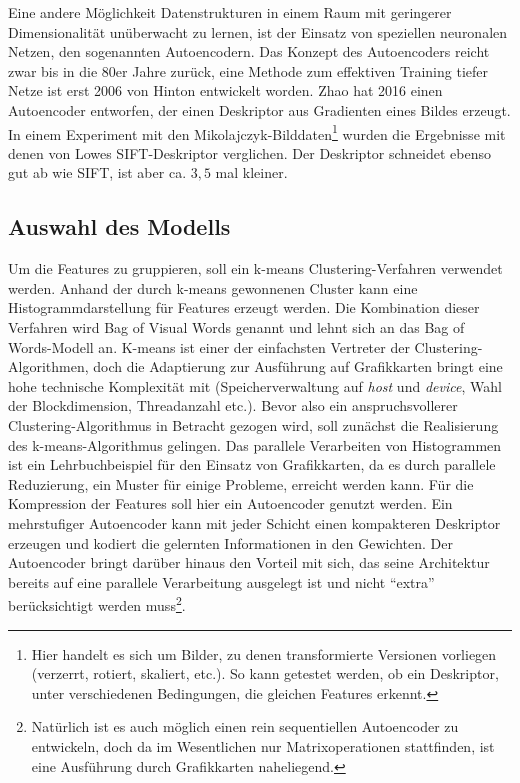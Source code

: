 
Eine andere Möglichkeit Datenstrukturen in einem Raum mit geringerer Dimensionalität unüberwacht zu lernen, ist der Einsatz von speziellen neuronalen Netzen, den sogenannten Autoencodern. Das Konzept des Autoencoders reicht zwar bis in die 80er Jahre zurück, eine Methode zum effektiven Training tiefer Netze ist erst 2006 von Hinton \cite{dae2006} entwickelt worden. Zhao \cite{aed2016} hat 2016 einen Autoencoder entworfen, der einen Deskriptor aus Gradienten eines Bildes erzeugt. In einem Experiment mit den Mikolajczyk-Bilddaten\footnote{Hier handelt es sich um Bilder, zu denen transformierte Versionen vorliegen (verzerrt, rotiert, skaliert, etc.). So kann getestet werden, ob ein Deskriptor, unter verschiedenen Bedingungen, die gleichen Features erkennt.} wurden die Ergebnisse mit denen von Lowes SIFT-Deskriptor verglichen. Der Deskriptor schneidet ebenso gut ab wie SIFT, ist aber ca. $3,5$ mal kleiner.

\subsection{Auswahl des Modells}

Um die Features zu gruppieren, soll ein k-means Clustering-Verfahren verwendet werden. Anhand der durch k-means gewonnenen Cluster kann eine Histogrammdarstellung für Features erzeugt werden. Die Kombination dieser Verfahren wird Bag of Visual Words genannt und lehnt sich an das Bag of Words-Modell an. K-means ist einer der einfachsten Vertreter der Clustering-Algorithmen, doch die Adaptierung zur Ausführung auf Grafikkarten bringt eine hohe technische Komplexität mit (Speicherverwaltung auf \textit{host} und \textit{device}, Wahl der Blockdimension, Threadanzahl etc.). Bevor also ein anspruchsvollerer Clustering-Algorithmus in Betracht gezogen wird, soll zunächst die Realisierung des k-means-Algorithmus gelingen. Das parallele Verarbeiten von Histogrammen ist ein Lehrbuchbeispiel für den Einsatz von Grafikkarten, da es durch parallele Reduzierung, ein Muster für einige Probleme, erreicht werden kann. \newline
Für die Kompression der Features soll hier ein Autoencoder genutzt werden. Ein mehrstufiger Autoencoder kann mit jeder Schicht einen kompakteren Deskriptor erzeugen und kodiert die gelernten Informationen in den Gewichten. Der Autoencoder bringt darüber hinaus den Vorteil mit sich, das seine Architektur bereits auf eine parallele Verarbeitung ausgelegt ist und nicht \enquote{extra} berücksichtigt werden muss\footnote{Natürlich ist es auch möglich einen rein sequentiellen Autoencoder zu entwickeln, doch da im Wesentlichen nur Matrixoperationen stattfinden, ist eine Ausführung durch Grafikkarten naheliegend.}.

